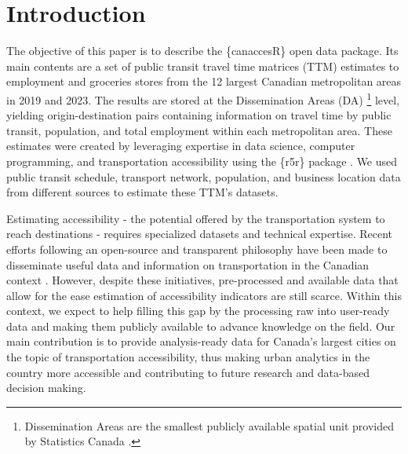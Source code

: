 \documentclass[Royal,times,sageh]{sagej}
\begin{document}
\maketitle

\section{Introduction}\label{introduction}

The objective of this paper is to describe the \{canaccesR\} open data
package. Its main contents are a set of public transit travel time
matrices (TTM) estimates to employment and groceries stores from the 12
largest Canadian metropolitan areas in 2019 and 2023. The results are
stored at the Dissemination Areas (DA) \footnote{Dissemination Areas are
  the smallest publicly available spatial unit provided by Statistics
  Canada \citep{governmentofcanadaDictionaryCensusPopulation2021a}.}
level, yielding origin-destination pairs containing information on
travel time by public transit, population, and total employment within
each metropolitan area. These estimates were created by leveraging
expertise in data science, computer programming, and transportation
accessibility using the \{r5r\} package
\citep{pereiraR5rRapidRealistic2021}. We used public transit schedule,
transport network, population, and business location data from different
sources to estimate these TTM's datasets.

Estimating accessibility - the potential offered by the transportation
system to reach destinations
\citep{paezMeasuringAccessibilityPositive2012} - requires specialized
datasets and technical expertise. Recent efforts following an
open-source and transparent philosophy have been made to disseminate
useful data and information on transportation in the Canadian context
\citep{soukhovTTS2016RDataSet2023}. However, despite these initiatives,
pre-processed and available data that allow for the ease estimation of
accessibility indicators are still scarce. Within this context, we
expect to help filling this gap by the processing raw into user-ready
data and making them publicly available to advance knowledge on the
field. Our main contribution is to provide analysis-ready data for
Canada's largest cities on the topic of transportation accessibility,
thus making urban analytics in the country more accessible and
contributing to future research and data-based decision making.
\end{document}
